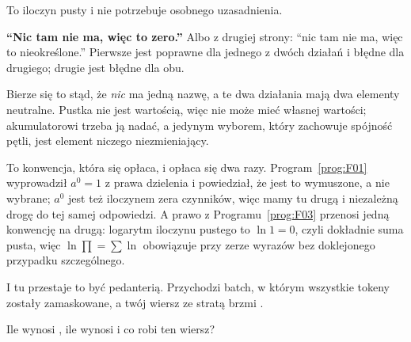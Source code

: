 \begin{fr}
To iloczyn pusty i nie potrzebuje osobnego uzasadnienia.

\begin{trapbox}
\textbf{\enquote{Nic tam nie ma, więc to zero.}} Albo z drugiej strony:
\enquote{nic tam nie ma, więc to nieokreślone.} Pierwsze jest poprawne dla
jednego z dwóch działań i błędne dla drugiego; drugie jest błędne dla obu.

Bierze się to stąd, że \emph{nic} ma jedną nazwę, a te dwa działania mają dwa
elementy neutralne. Pustka nie jest wartością, więc nie może mieć własnej
wartości; akumulatorowi trzeba ją nadać, a jedynym wyborem, który zachowuje
spójność pętli, jest element niczego niezmieniający.

To konwencja, która się opłaca, i opłaca się dwa razy. Program~\ref{prog:F01}
wyprowadził $a^{0} = 1$ z prawa dzielenia i powiedział, że jest to wymuszone,
a nie wybrane; $a^{0}$ jest też iloczynem zera czynników, więc mamy tu drugą i
niezależną drogę do tej samej odpowiedzi. A prawo z Programu~\ref{prog:F03}
przenosi jedną konwencję na drugą: logarytm iloczynu pustego to $\ln 1 = 0$,
czyli dokładnie suma pusta, więc $\ln \prod = \sum \ln$ obowiązuje przy zerze
wyrazów bez doklejonego przypadku szczególnego.
\end{trapbox}

I tu przestaje to być pedanterią. Przychodzi batch, w którym wszystkie tokeny
zostały zamaskowane, a twój wiersz ze stratą brzmi .

Ile wynosi , ile wynosi  i co robi ten wiersz?
\nextframe
\end{fr}

